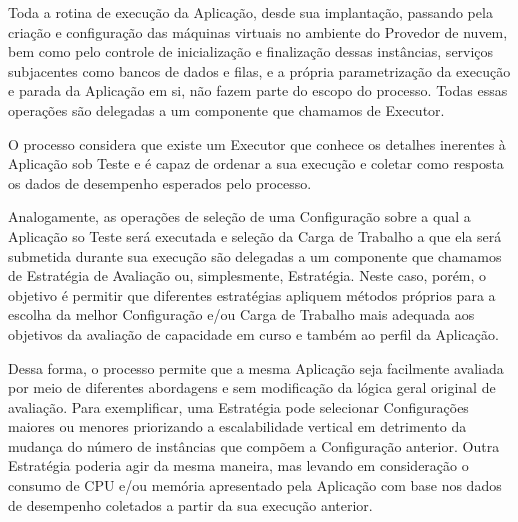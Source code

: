 Toda a rotina de execução da Aplicação, desde sua implantação, passando pela 
criação e configuração das máquinas virtuais no ambiente do Provedor de nuvem, 
bem como pelo controle de inicialização e finalização dessas instâncias, serviços
subjacentes como bancos de dados e filas, e a própria parametrização da execução
e parada da Aplicação em si, não fazem parte do escopo do processo. Todas essas
operações são delegadas a um componente que chamamos de Executor. 

O processo considera que existe um Executor que conhece os detalhes inerentes à 
Aplicação sob Teste e é capaz de ordenar a sua execução e coletar como resposta
os dados de desempenho esperados pelo processo.

Analogamente, as operações de seleção de uma Configuração sobre a qual a Aplicação
so Teste será executada e seleção da Carga de Trabalho a que ela será submetida 
durante sua execução são delegadas a um componente que chamamos de Estratégia de
Avaliação ou, simplesmente, Estratégia. Neste caso, porém, o objetivo é permitir
que diferentes estratégias apliquem métodos próprios para a escolha da melhor 
Configuração e/ou Carga de Trabalho mais adequada aos objetivos da avaliação de
capacidade em curso e também ao perfil da Aplicação.

Dessa forma, o processo permite que a mesma Aplicação seja facilmente avaliada 
por meio de diferentes abordagens e sem modificação da lógica geral original de 
avaliação. Para exemplificar, uma Estratégia pode selecionar Configurações 
maiores ou menores priorizando a escalabilidade vertical em detrimento da mudança
do número de instâncias que compõem a Configuração anterior. Outra Estratégia 
poderia agir da mesma maneira, mas levando em consideração o consumo de CPU e/ou
memória apresentado pela Aplicação com base nos dados de desempenho coletados a
partir da sua execução anterior.

